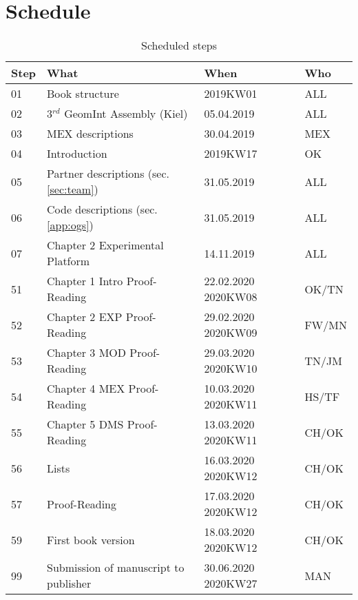 \section*{Schedule}

\begin{table}[h!]
\centering
\caption{Scheduled steps}
\label{tab:schedule}
\begin{tabular}{|p{0.3in}|p{2.7in}|p{0.7in}|p{0.5in}|} \hline 
\rowcolor{gray!50}
Step & What & When & Who \\ \hline \hline
\rowcolor{green!50}
01 & Book structure & 2019KW01 & ALL \\ \hline 
\hline
02 & 3$^{rd}$ GeomInt Assembly (Kiel) & 05.04.2019 & ALL \\ \hline 
03 & MEX descriptions & 30.04.2019 & MEX \\ \hline 
04 & Introduction & 2019KW17 & OK \\ \hline 
05 & Partner descriptions (sec. \ref{sec:team}) & 31.05.2019 & ALL \\ \hline 
06 & Code descriptions (sec. \ref{app:ogs}) & 31.05.2019 & ALL \\ \hline 
07 & Chapter 2 Experimental Platform & 14.11.2019 & ALL \\ \hline 
\hline
\rowcolor{green!50}
51 & Chapter 1 Intro Proof-Reading & 22.02.2020 2020KW08 & OK/TN \\ \hline 
52 & Chapter 2 EXP Proof-Reading & 29.02.2020 2020KW09 & FW/MN \\ \hline 
53 & Chapter 3 MOD Proof-Reading & 29.03.2020 2020KW10 & TN/JM \\ \hline 
54 & Chapter 4 MEX Proof-Reading & 10.03.2020 2020KW11 & HS/TF \\ \hline 
55 & Chapter 5 DMS Proof-Reading & 13.03.2020 2020KW11 & CH/OK \\ \hline 
56 & Lists & 16.03.2020 2020KW12 & CH/OK \\ \hline 
57 & Proof-Reading & 17.03.2020 2020KW12 & CH/OK \\ \hline 
\rowcolor{red!50}
59 & First book version & 18.03.2020 2020KW12 & CH/OK \\ \hline
\hline
\rowcolor{red!50}
99 & Submission of manuscript to publisher & 30.06.2020 2020KW27 & MAN \\ \hline
\end{tabular}
\end{table}


